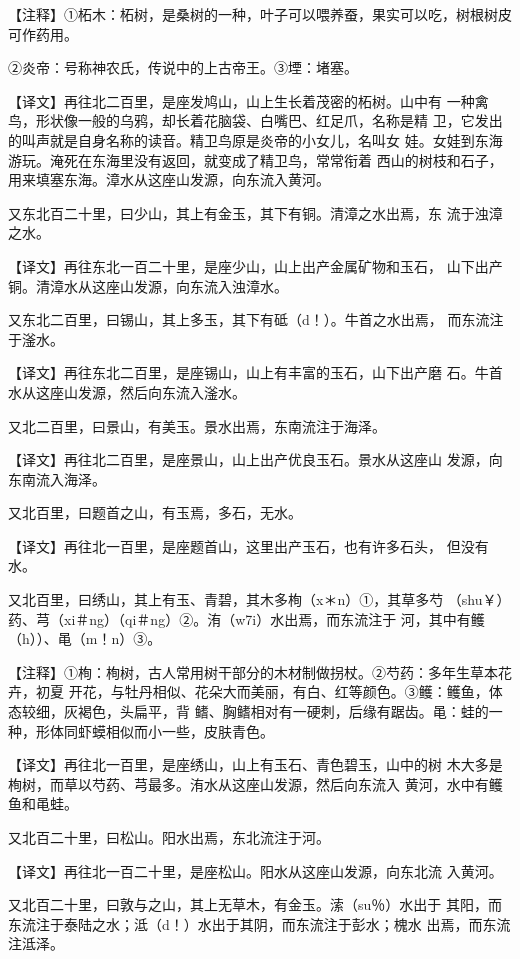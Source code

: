 \documentclass[a4paper,12pt,UTF8,twoside]{ctexbook}
\begin{document}
【注释】①柘木：柘树，是桑树的一种，叶子可以喂养蚕，果实可以吃，树根树皮可作药用。

②炎帝：号称神农氏，传说中的上古帝王。③堙：堵塞。

【译文】再往北二百里，是座发鸠山，山上生长着茂密的柘树。山中有 一种禽鸟，形状像一般的乌鸦，却长着花脑袋、白嘴巴、红足爪，名称是精 卫，它发出的叫声就是自身名称的读音。精卫鸟原是炎帝的小女儿，名叫女 娃。女娃到东海游玩。淹死在东海里没有返回，就变成了精卫鸟，常常衔着 西山的树枝和石子，用来填塞东海。漳水从这座山发源，向东流入黄河。

又东北百二十里，曰少山，其上有金玉，其下有铜。清漳之水出焉，东 流于浊漳之水。

【译文】再往东北一百二十里，是座少山，山上出产金属矿物和玉石， 山下出产铜。清漳水从这座山发源，向东流入浊漳水。

又东北二百里，曰锡山，其上多玉，其下有砥（d！）。牛首之水出焉， 而东流注于滏水。

【译文】再往东北二百里，是座锡山，山上有丰富的玉石，山下出产磨 石。牛首水从这座山发源，然后向东流入滏水。

又北二百里，曰景山，有美玉。景水出焉，东南流注于海泽。

【译文】再往北二百里，是座景山，山上出产优良玉石。景水从这座山 发源，向东南流入海泽。

又北百里，曰题首之山，有玉焉，多石，无水。

【译文】再往北一百里，是座题首山，这里出产玉石，也有许多石头， 但没有水。

又北百里，曰绣山，其上有玉、青碧，其木多栒（x＊n）①，其草多芍 （shu￥）药、芎（xi＃ng）（qi＃ng）②。洧（w7i）水出焉，而东流注于 河，其中有鳠（h））、黾（m！n）③。

【注释】①栒：栒树，古人常用树干部分的木材制做拐杖。②芍药：多年生草本花卉，初夏 开花，与牡丹相似、花朵大而美丽，有白、红等颜色。③鳠：鳠鱼，体态较细，灰褐色，头扁平，背 鳍、胸鳍相对有一硬刺，后缘有踞齿。黾：蛙的一种，形体同虾蟆相似而小一些，皮肤青色。

【译文】再往北一百里，是座绣山，山上有玉石、青色碧玉，山中的树 木大多是栒树，而草以芍药、芎最多。洧水从这座山发源，然后向东流入 黄河，水中有鳠鱼和黾蛙。

又北百二十里，曰松山。阳水出焉，东北流注于河。

【译文】再往北一百二十里，是座松山。阳水从这座山发源，向东北流 入黄河。

又北百二十里，曰敦与之山，其上无草木，有金玉。溹（su％）水出于 其阳，而东流注于泰陆之水；泜（d！）水出于其阴，而东流注于彭水；槐水 出焉，而东流注泜泽。
\end{document}

